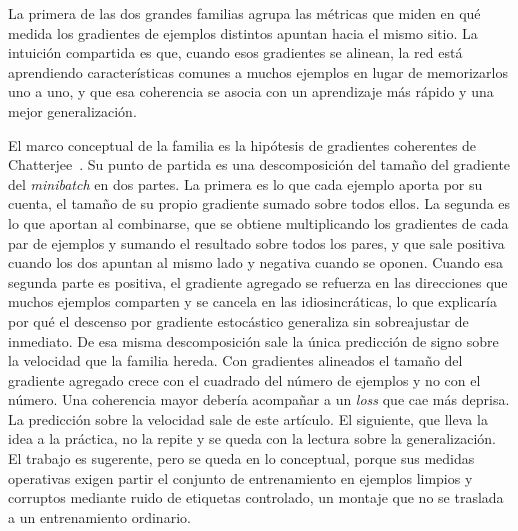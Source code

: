 La primera de las dos grandes familias agrupa las métricas que miden en qué medida los gradientes de ejemplos distintos apuntan hacia el mismo sitio. La intuición compartida es que, cuando esos gradientes se alinean, la red está aprendiendo características comunes a muchos ejemplos en lugar de memorizarlos uno a uno, y que esa coherencia se asocia con un aprendizaje más rápido y una mejor generalización.

El marco conceptual de la familia es la hipótesis de gradientes coherentes de Chatterjee~\cite{chatterjee2020coherent}. Su punto de partida es una descomposición del tamaño del gradiente del \emph{minibatch} en dos partes. La primera es lo que cada ejemplo aporta por su cuenta, el tamaño de su propio gradiente sumado sobre todos ellos. La segunda es lo que aportan al combinarse, que se obtiene multiplicando los gradientes de cada par de ejemplos y sumando el resultado sobre todos los pares, y que sale positiva cuando los dos apuntan al mismo lado y negativa cuando se oponen. Cuando esa segunda parte es positiva, el gradiente agregado se refuerza en las direcciones que muchos ejemplos comparten y se cancela en las idiosincráticas, lo que explicaría por qué el descenso por gradiente estocástico generaliza sin sobreajustar de inmediato. De esa misma descomposición sale la única predicción de signo sobre la velocidad que la familia hereda. Con gradientes alineados el tamaño del gradiente agregado crece con el cuadrado del número de ejemplos y no con el número. Una coherencia mayor debería acompañar a un \emph{loss} que cae más deprisa. La predicción sobre la velocidad sale de este artículo. El siguiente, que lleva la idea a la práctica, no la repite y se queda con la lectura sobre la generalización. El trabajo es sugerente, pero se queda en lo conceptual, porque sus medidas operativas exigen partir el conjunto de entrenamiento en ejemplos limpios y corruptos mediante ruido de etiquetas controlado, un montaje que no se traslada a un entrenamiento ordinario.

